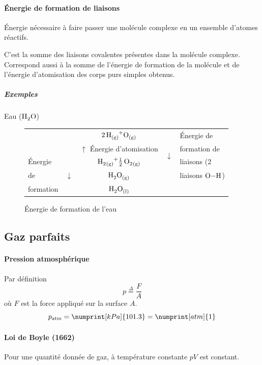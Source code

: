 \documentclass[11pt,a4paper,french]{article}
\newcommand\gaz{_{(g)}}
\newcommand\liquid{_{(l)}}
\newcommand\eqdef{\stackrel{\Delta}{=}}
\begin{document}
\paragraph{\'Energie de formation de liaisons}
\'Energie nécessaire à faire passer une molécule complexe en un ensemble d'atomes réactifs.

C'est la somme des liaisons covalentes présentes dans la molécule complexe.
Correspond aussi à la somme de l'énergie de formation de la molécule et de l'énergie d'atomisation des corps purs simples obtenus.

\subparagraph{Exemples}
Eau ($\ce{H2O}$)
\begin{figure}[h!]
	\begin{center}
		\begin{tabular}{clc|cl|}
			\cline{4-5}
			& & $\ce{2H\gaz + O\gaz}$ & \multirow{4}{*}{$\downarrow$} & \'Energie de\\
			\cline{3-3}
			& & \multicolumn{1}{|c}{$\uparrow$ \'Energie d'atomisation} & & formation de\\
			\cline{1-3}
			\multicolumn{1}{|l}{\'Energie} & \multicolumn{1}{c|}{} & $\ce{H2\gaz + 1/2O2\gaz}$ & & liaisons (2\\
			\multicolumn{1}{|l}{de} & \multicolumn{1}{c|}{$\downarrow$} & $\ce{H2O\gaz}$ & & liaisons $\ce{O-H}$)\\
			\cline{4-5}
			\multicolumn{1}{|l}{formation} & \multicolumn{1}{c|}{} & \multicolumn{1}{c}{$\ce{H2O\liquid}$} & & \multicolumn{1}{l}{}\\
			\cline{1-2}
		\end{tabular}
	\end{center}
	\label{fig:form_eau}
	\caption{\'Energie de formation de l'eau}
\end{figure}

\subsection{Gaz parfaits}

\paragraph{Pression atmosphérique}
Par définition
$$p \eqdef \frac{F}{A}$$
où $F$ est la force appliqué sur la surface $A$.
\[ p_\mathrm{atm}=\numprint[kPa]{101.3}=\numprint[atm]{1} \]

\paragraph{Loi de Boyle (1662)}
Pour une quantité donnée de gaz, à température constante $p V$ est constant.
\end{document}
